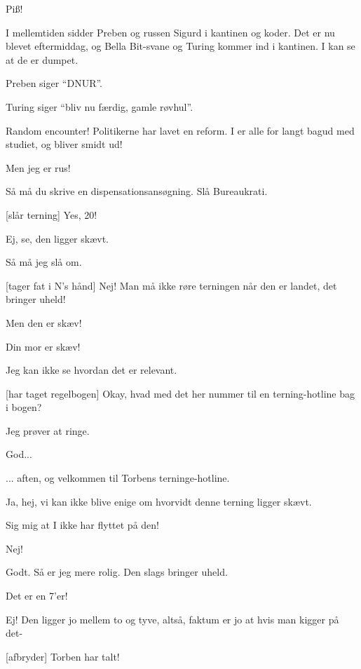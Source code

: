 \documentclass[a4paper,11pt]{article}
\begin{document}
\begin{sketch}

 Piß!

 I mellemtiden sidder Preben og russen Sigurd i kantinen og koder.  Det
er nu blevet eftermiddag, og Bella Bit-svane og Turing kommer ind i kantinen.  I
kan se at de er dumpet.

 Preben siger ``DNUR''.

 Turing siger ``bliv nu færdig, gamle røvhul''.

 Random encounter!  
Politikerne har lavet en reform.  I er alle for langt bagud med studiet, og
bliver smidt ud!

 Men jeg er rus!

 Så må du skrive en dispensationsansøgning.  Slå Bureaukrati.


[slår terning] Yes, 20!

 Ej, se, den ligger skævt.

 Så må jeg slå om. 

[tager fat i N's hånd] Nej!  Man må ikke røre terningen når den er
landet, det bringer uheld! 

 Men den er skæv!

 Din mor er skæv!

 Jeg kan ikke se hvordan det er relevant.

[har taget regelbogen] Okay, hvad med det her nummer til en
terning-hotline bag i bogen?

 Jeg prøver at ringe.


 God...


 ... aften, og velkommen til Torbens terninge-hotline.

 Ja, hej, vi kan ikke blive enige om hvorvidt denne terning ligger
skævt.

 Sig mig at I ikke har flyttet på den!

 Nej!

 Godt.  Så er jeg mere rolig. Den slags bringer uheld.


 Det er en 7'er!

 Ej!  Den ligger jo mellem to og tyve, altså, faktum er jo at hvis man
kigger på det-

[afbryder] Torben har talt!



\end{sketch}
\end{document}
